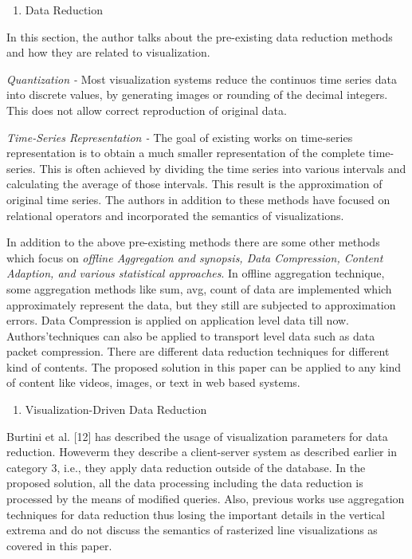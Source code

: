 \begin{enumerate}
	\item Data Reduction
\end{enumerate}

In this section, the author talks about the pre-existing data reduction methods and how they are related to visualization.\newline

\textit{Quantization - }
Most visualization systems reduce the continuos time series data into discrete values, by generating images or rounding of the decimal integers. This does not allow correct reproduction of original data. \newline

\textit{Time-Series Representation -}
The goal of existing works on time-series representation is to obtain a much smaller representation of the complete time-series. This is often achieved by dividing the time series into various intervals and calculating the average of those intervals. This result is the approximation of original time series. The authors in addition to these methods have focused on relational operators and incorporated the semantics of visualizations. \newline

In addition to the above pre-existing methods there are some other methods which focus on \textit{offline Aggregation and synopsis, Data Compression, Content Adaption, and various statistical approaches}. In offline aggregation technique, some aggregation methods like sum, avg, count of data are implemented which approximately represent the data, but they still are subjected to approximation errors. Data Compression is applied on application level data till now. Authors’techniques can also be applied to transport level data such as data packet compression. There are different data reduction techniques for different kind of contents. The proposed solution in this paper can be applied to any kind of content like videos, images, or text in web based systems.
\newline


\begin{enumerate}
	\item Visualization-Driven Data Reduction 
\end{enumerate}

Burtini et al. [12] has described the usage of visualization parameters for data reduction. Howeverm they describe a client-server system as described earlier in category 3, i.e., they apply data reduction outside of the database. In the proposed solution, all the data processing including the data reduction is processed by the means of modified queries. Also, previous works use aggregation techniques for data reduction thus losing the important details in the vertical extrema and do not discuss the semantics of rasterized line visualizations as covered in this paper. 
